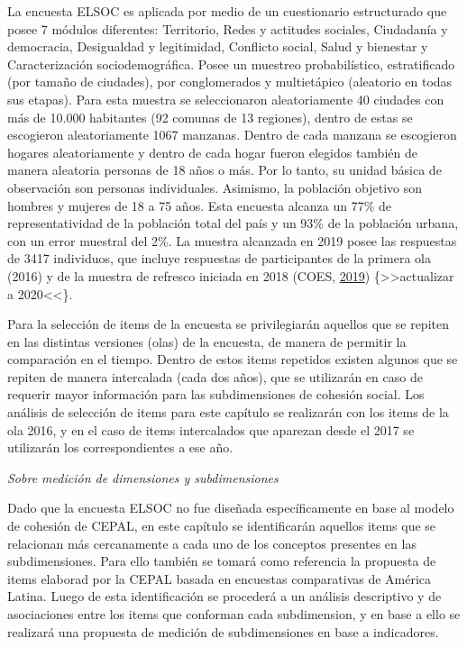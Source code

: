 \documentclass[
  12pt,
]{book}
\begin{document}
La encuesta ELSOC es aplicada por medio de un cuestionario estructurado que posee 7 módulos diferentes: Territorio, Redes y actitudes sociales, Ciudadanía y democracia, Desigualdad y legitimidad, Conflicto social, Salud y bienestar y Caracterización sociodemográfica. Posee un muestreo probabilístico, estratificado (por tamaño de ciudades), por conglomerados y multietápico (aleatorio en todas sus etapas). Para esta muestra se seleccionaron aleatoriamente 40 ciudades con más de 10.000 habitantes (92 comunas de 13 regiones), dentro de estas se escogieron aleatoriamente 1067 manzanas. Dentro de cada manzana se escogieron hogares aleatoriamente y dentro de cada hogar fueron elegidos también de manera aleatoria personas de 18 años o más. Por lo tanto, su unidad básica de observación son personas individuales. Asimismo, la población objetivo son hombres y mujeres de 18 a 75 años. Esta encuesta alcanza un 77\% de representatividad de la población total del país y un 93\% de la población urbana, con un error muestral del 2\%. La muestra alcanzada en 2019 posee las respuestas de 3417 individuos, que incluye respuestas de participantes de la primera ola (2016) y de la muestra de refresco iniciada en 2018 (COES, \protect\hyperlink{ref-coes_radiografia_2019}{2019}) \{\textgreater\textgreater actualizar a 2020\textless\textless\}.

Para la selección de items de la encuesta se privilegiarán aquellos que se repiten en las distintas versiones (olas) de la encuesta, de manera de permitir la comparación en el tiempo. Dentro de estos items repetidos existen algunos que se repiten de manera intercalada (cada dos años), que se utilizarán en caso de requerir mayor información para las subdimensiones de cohesión social. Los análisis de selección de items para este capítulo se realizarán con los items de la ola 2016, y en el caso de items intercalados que aparezan desde el 2017 se utilizarán los correspondientes a ese año.

\emph{Sobre medición de dimensiones y subdimensiones}

Dado que la encuesta ELSOC no fue diseñada específicamente en base al modelo de cohesión de CEPAL, en este capítulo se identificarán aquellos items que se relacionan más cercanamente a cada uno de los conceptos presentes en las subdimensiones. Para ello también se tomará como referencia la propuesta de items elaborad por la CEPAL basada en encuestas comparativas de América Latina. Luego de esta identificación se procederá a un análisis descriptivo y de asociaciones entre los items que conforman cada subdimension, y en base a ello se realizará una propuesta de medición de subdimensiones en base a indicadores.
\end{document}
